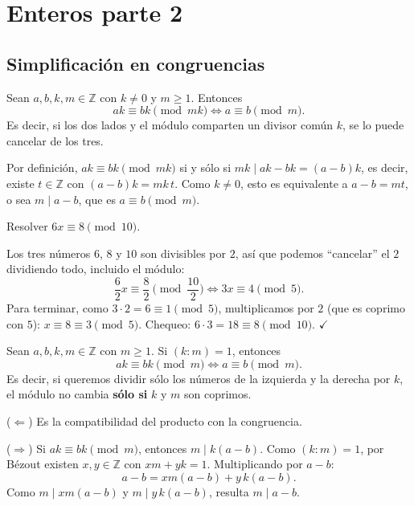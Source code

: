 \chapter{Enteros parte 2}

\section{Simplificación en congruencias}

\begin{proposicion}[{title={Regla 1: simplificar un factor en toda la congruencia (incluido el módulo)}}]
Sean $a,b,k,m\in\mathbb{Z}$ con $k\neq 0$ y $m\ge 1$. Entonces
\[
ak\equiv bk \pmod{mk} \iff a\equiv b \pmod m.
\]
Es decir, si los dos lados y el módulo comparten un divisor común $k$, se lo
puede cancelar de los tres.
\end{proposicion}

\begin{demostracion}
Por definición, $ak\equiv bk \pmod{mk}$ si y sólo si $mk\mid ak-bk=(a-b)k$,
es decir, existe $t\in\mathbb{Z}$ con $(a-b)k=mk\,t$. Como $k\neq 0$, esto es
equivalente a $a-b=mt$, o sea $m\mid a-b$, que es $a\equiv b \pmod m$.
\end{demostracion}

\begin{ejemplo}
Resolver $6x\equiv 8 \pmod{10}$.

Los tres números $6$, $8$ y $10$ son divisibles por $2$, así que podemos
``cancelar'' el $2$ dividiendo todo, incluido el módulo:
\[
\frac{6}{2}x\equiv \frac{8}{2} \pmod{\frac{10}{2}} \iff 3x\equiv 4 \pmod 5.
\]
Para terminar, como $3\cdot 2=6\equiv 1 \pmod 5$, multiplicamos por $2$ (que es
coprimo con $5$): $x\equiv 8\equiv 3 \pmod 5$. Chequeo: $6\cdot 3=18\equiv 8 \pmod{10}$. $\checkmark$
\end{ejemplo}

\begin{proposicion}[{title={Regla 2: simplificar un factor sólo a los lados (si es coprimo con el módulo)}}]
Sean $a,b,k,m\in\mathbb{Z}$ con $m\ge 1$. Si $(k:m)=1$, entonces
\[
ak\equiv bk \pmod m \iff a\equiv b \pmod m.
\]
Es decir, si queremos dividir sólo los números de la izquierda y la derecha por
$k$, el módulo no cambia \textbf{sólo si} $k$ y $m$ son coprimos.
\end{proposicion}

\begin{demostracion}
($\Leftarrow$) Es la compatibilidad del producto con la congruencia.

($\Rightarrow$) Si $ak\equiv bk \pmod m$, entonces $m\mid k(a-b)$. Como $(k:m)=1$,
por Bézout existen $x,y\in\mathbb{Z}$ con $xm+yk=1$. Multiplicando por $a-b$:
\[
a-b=xm(a-b)+y\,k(a-b).
\]
Como $m\mid xm(a-b)$ y $m\mid y\,k(a-b)$, resulta $m\mid a-b$.
\end{demostracion}


